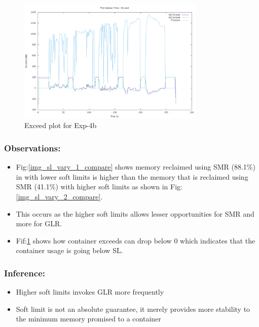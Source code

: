	\begin{figure}
	  \centering
	  \includegraphics[width=0.8\textwidth]{images/experimentation/sl_vary/2/Exceed.png}
	  \caption{Exceed plot for Exp-4b}
	  \label{img_sl_vary_2_exceed}
	\end{figure}
	  
	\subsubsection{Observations:}
	
	  \begin{itemize}
	  \item Fig:\ref{img_sl_vary_1_compare} shows memory reclaimed using SMR (88.1\%) in with lower soft limits is higher than the 
memory that is reclaimed using SMR (41.1\%) with higher soft limits as shown in Fig:\ref{img_sl_vary_2_compare}. 
	  \item This occurs as the higher soft limits allows lesser opportunities for SMR and more for GLR.
	  \item Fif:\ref{img_sl_vary_2_exceed} shows how container exceeds can drop below 0 which indicates that the container usage is 
going below SL.
	\end{itemize}

	\subsubsection{Inference:}
	
	\begin{itemize}
	  \item Higher soft limits invokes GLR more frequently
	  \item Soft limit is not an absolute guarantee, it merely provides more stability to the minimum memory promised to a container 
	\end{itemize}
	
